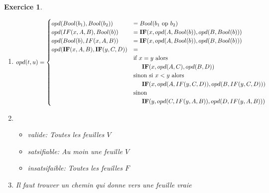 \documentclass{article}
\theoremstyle{plain}
\newtheorem{exo}{Exercice}%
\begin{document}
\begin{exo}
\begin{enumerate}
    \item \begin{align*}
        opd(t, u) = \begin{cases}
            opd(Bool(b_1), Bool(b_2)) &= Bool(b_1 \text{ op } b_2) \\
            opd(IF(x, A, B), Bool(b)) &= \textbf{IF}(x, opd(A, Bool(b)), opd(B, Bool(b))) \\
            opd(Bool(b), IF(x, A, B)) &= \textbf{IF}(x, opd(A, Bool(b)), opd(B, Bool(b))) \\
            opd(\textbf{IF}(x, A, B), \textbf{IF}(y, C, D)) &= \\
                            &\text{if } x = y \text{ alors} \\
                                &\hspace{5mm} \textbf{IF}(x, opd(A, C), opd(B, D)) \\
                            &\text{sinon si } x < y \text{ alors} \\
                                &\hspace{5mm} \textbf{IF}(x, opd(A, IF(y, C, D)), opd(B, IF(y, C, D))) \\
                            &\text{sinon } \\
                                &\hspace{5mm} \textbf{IF}(y, opd(C, IF(y, A, B)), opd(D, IF(y, A, B)))
        \end{cases}
    \end{align*}

    \item \begin{itemize}
        \item valide: Toutes les feuilles $V$
        \item satsifiable: Au moin une feuille $V$
        \item insatsifaible: Toutes les feuilles $F$
    \end{itemize}

    \item Il faut trouver un chemin qui donne vers une feuille vraie
\end{enumerate}
\end{exo}
\end{document}
